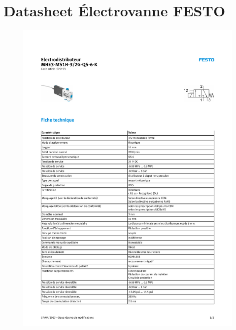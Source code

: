 \documentclass[
    iai & comatec, %
    mi, %
]{heig-tb}
\begin{document}
\section{Datasheet Électrovanne FESTO}
\begin{figure}[H]
    \hspace{-1cm}
    \includegraphics[scale = 0.8, page = 1]{assets/pdf/Electrovanne_datasheet.pdf}
\end{figure}

\end{document}
